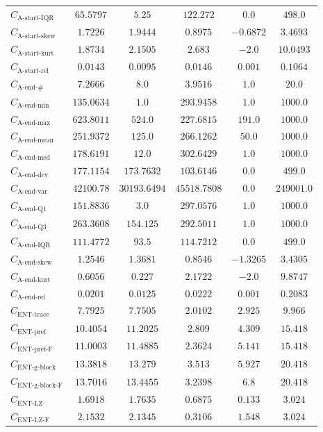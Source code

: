 \documentclass{standalone}
\newcommand{\startactivitiesrelname}{\text{A-start-rel}}
\newcommand{\startactivitiesrel}{C_{\startactivitiesrelname}}
\newcommand{\startiqrname}{\text{A-start-IQR}}
\newcommand{\startiqr}{C_{\startiqrname}}
\newcommand{\startskewname}{\text{A-start-skew}}
\newcommand{\startskew}{C_{\startskewname}}
\newcommand{\startkurtname}{\text{A-start-kurt}}
\newcommand{\startkurt}{C_{\startkurtname}}
\newcommand{\lastactivitiesname}{\text{A-end-\#}}
\newcommand{\lastactivities}{C_{\lastactivitiesname}}
\newcommand{\lastactivitiesrelname}{\text{A-end-rel}}
\newcommand{\lastactivitiesrel}{C_{\lastactivitiesrelname}}
\newcommand{\lastminname}{\text{A-end-min}}
\newcommand{\lastmin}{C_{\lastminname}}
\newcommand{\lastmaxname}{\text{A-end-max}}
\newcommand{\lastmax}{C_{\lastmaxname}}
\newcommand{\lastmeanname}{\text{A-end-mean}}
\newcommand{\lastmean}{C_{\lastmeanname}}
\newcommand{\lastmedianname}{\text{A-end-med}}
\newcommand{\lastmedian}{C_{\lastmedianname}}
\newcommand{\lastdevname}{\text{A-end-dev}}
\newcommand{\lastdev}{C_{\lastdevname}}
\newcommand{\lastvarname}{\text{A-end-var}}
\newcommand{\lastvar}{C_{\lastvarname}}
\newcommand{\lastqonename}{\text{A-end-Q1}}
\newcommand{\lastqone}{C_{\lastqonename}}
\newcommand{\lastqthreename}{\text{A-end-Q3}}
\newcommand{\lastqthree}{C_{\lastqthreename}}
\newcommand{\lastiqrname}{\text{A-end-IQR}}
\newcommand{\lastiqr}{C_{\lastiqrname}}
\newcommand{\lastskewname}{\text{A-end-skew}}
\newcommand{\lastskew}{C_{\lastskewname}}
\newcommand{\lastkurtname}{\text{A-end-kurt}}
\newcommand{\lastkurt}{C_{\lastkurtname}}
\newcommand{\enttracename}{\text{ENT-trace}}
\newcommand{\enttrace}{C_{\enttracename}}
\newcommand{\entprefixname}{\text{ENT-pref}}
\newcommand{\entprefix}{C_{\entprefixname}}
\newcommand{\entprefixflatname}{\text{ENT-pref-F}}
\newcommand{\entprefixflat}{C_{\entprefixflatname}}
\newcommand{\entgblockname}{\text{ENT-g-block}}
\newcommand{\entgblock}{C_{\entgblockname}}
\newcommand{\entgblockflatname}{\text{ENT-g-block-F}}
\newcommand{\entgblockflat}{C_{\entgblockflatname}}
\newcommand{\entlempelzivname}{\text{ENT-LZ}}
\newcommand{\entlempelziv}{C_{\entlempelzivname}}
\newcommand{\entlempelzivflatname}{\text{ENT-LZ-F}}
\newcommand{\entlempelzivflat}{C_{\entlempelzivflatname}}
\begin{document}
\begin{tabular}{lccccc}
$\startiqr$ & $65.5797$ & $5.25$ & $122.272$ & $0.0$ & $498.0$ \\ 
$\startskew$ & $1.7226$ & $1.9444$ & $0.8975$ & $-0.6872$ & $3.4693$ \\ 
$\startkurt$ & $1.8734$ & $2.1505$ & $2.683$ & $-2.0$ & $10.0493$ \\ 
$\startactivitiesrel$ & $0.0143$ & $0.0095$ & $0.0146$ & $0.001$ & $0.1064$ \\ 
$\lastactivities$ & $7.2666$ & $8.0$ & $3.9516$ & $1.0$ & $20.0$ \\ 
$\lastmin$ & $135.0634$ & $1.0$ & $293.9458$ & $1.0$ & $1000.0$ \\ 
$\lastmax$ & $623.8011$ & $524.0$ & $227.6815$ & $191.0$ & $1000.0$ \\ 
$\lastmean$ & $251.9372$ & $125.0$ & $266.1262$ & $50.0$ & $1000.0$ \\ 
$\lastmedian$ & $178.6191$ & $12.0$ & $302.6429$ & $1.0$ & $1000.0$ \\ 
$\lastdev$ & $177.1154$ & $173.7632$ & $103.6146$ & $0.0$ & $499.0$ \\ 
$\lastvar$ & $42100.78$ & $30193.6494$ & $45518.7808$ & $0.0$ & $249001.0$ \\ 
$\lastqone$ & $151.8836$ & $3.0$ & $297.0576$ & $1.0$ & $1000.0$ \\ 
$\lastqthree$ & $263.3608$ & $154.125$ & $292.5011$ & $1.0$ & $1000.0$ \\ 
$\lastiqr$ & $111.4772$ & $93.5$ & $114.7212$ & $0.0$ & $499.0$ \\ 
$\lastskew$ & $1.2546$ & $1.3681$ & $0.8546$ & $-1.3265$ & $3.4305$ \\ 
$\lastkurt$ & $0.6056$ & $0.227$ & $2.1722$ & $-2.0$ & $9.8747$ \\ 
$\lastactivitiesrel$ & $0.0201$ & $0.0125$ & $0.0222$ & $0.001$ & $0.2083$ \\ 
$\enttrace$ & $7.7925$ & $7.7505$ & $2.0102$ & $2.925$ & $9.966$ \\ 
$\entprefix$ & $10.4054$ & $11.2025$ & $2.809$ & $4.309$ & $15.418$ \\ 
$\entprefixflat$ & $11.0003$ & $11.4885$ & $2.3624$ & $5.141$ & $15.418$ \\ 
$\entgblock$ & $13.3818$ & $13.279$ & $3.513$ & $5.927$ & $20.418$ \\ 
$\entgblockflat$ & $13.7016$ & $13.4455$ & $3.2398$ & $6.8$ & $20.418$ \\ 
$\entlempelziv$ & $1.6918$ & $1.7635$ & $0.6875$ & $0.133$ & $3.024$ \\ 
$\entlempelzivflat$ & $2.1532$ & $2.1345$ & $0.3106$ & $1.548$ & $3.024$ \\ 

\end{tabular}
\end{document}
